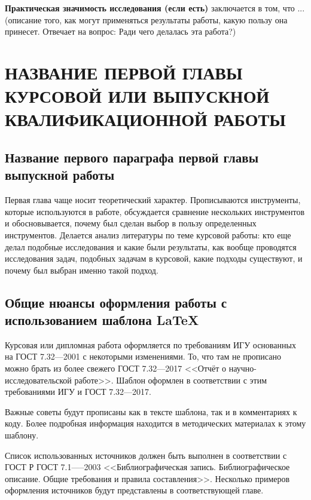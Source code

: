 \documentclass{report}
\begin{document}
{\bf Практическая значимость исследования (если есть)} заключается в том, что ... (описание того, как могут применяться результаты работы, какую пользу она принесет. Отвечает на вопрос: Ради чего делалась эта работа?)

% 
\setcounter{section}{0} %
\setcounter{subsection}{0} %
\setcounter{equation}{0} %

\chapter{НАЗВАНИЕ ПЕРВОЙ ГЛАВЫ КУРСОВОЙ ИЛИ ВЫПУСКНОЙ КВАЛИФИКАЦИОННОЙ РАБОТЫ}

\section{Название первого параграфа первой главы выпускной работы}

Первая глава чаще носит теоретический характер. Прописываются инструменты, которые используются в работе, обсуждается сравнение нескольких инструментов и обосновывается, почему был сделан выбор в пользу определенных инструментов. Делается анализ литературы по теме курсовой работы: кто еще делал подобные исследования и какие были результаты, как вообще проводятся исследования задач, подобных задачам в курсовой, какие подходы существуют, и почему был выбран именно такой подход.

\section{Общие нюансы оформления работы с использованием шаблона \LaTeX}
Курсовая или дипломная работа оформляется по требованиям ИГУ основанных на ГОСТ 7.32---2001 с некоторыми изменениями. То, что там не прописано можно брать из более свежего ГОСТ 7.32---2017 <<Отчёт о научно-исследовательской работе>>. Шаблон оформлен в соответствии с этим требованиями ИГУ и ГОСТ 7.32---2017. 

Важные советы будут прописаны как в тексте шаблона, так и в комментариях к коду. Более подробная информация находится в методических материалах к этому шаблону.

Список использованных источников должен быть выполнен в соответствии с ГОСТ Р ГОСТ 7.1—--2003 <<Библиографическая запись. Библиографическое описание. Общие требования и правила составления>>. Несколько примеров оформления источников будут представлены в соответствующей главе.
\end{document}
